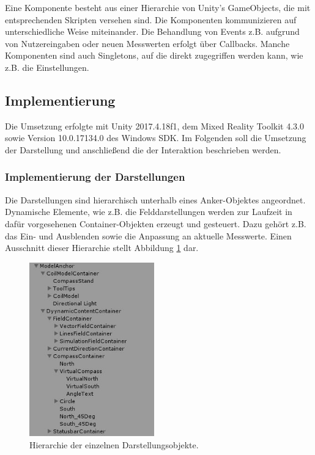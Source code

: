 Eine Komponente besteht aus einer Hierarchie von Unity's GameObjects, die mit entsprechenden Skripten versehen sind. Die Komponenten kommunizieren auf unterschiedliche Weise miteinander. Die Behandlung von Events z.B. aufgrund von Nutzereingaben oder neuen Messwerten erfolgt über Callbacks. Manche Komponenten sind auch Singletons, auf die direkt zugegriffen werden kann, wie z.B. die Einstellungen.

\subsection{Implementierung}
\label{sec-5-2}
Die Umsetzung erfolgte mit Unity 2017.4.18f1, dem Mixed Reality Toolkit 4.3.0 sowie Version 10.0.17134.0 des Windows SDK. Im Folgenden soll die Umsetzung der Darstellung und anschließend die der Interaktion beschrieben werden.

\subsubsection{Implementierung der Darstellungen}
\label{sec-5-2-2}
Die Darstellungen sind hierarchisch unterhalb eines Anker-Objektes angeordnet. Dynamische Elemente, wie z.B. die Felddarstellungen werden zur Laufzeit in dafür vorgesehenen Container-Objekten erzeugt und gesteuert. Dazu gehört z.B. das Ein- und Ausblenden sowie die Anpassung an aktuelle Messwerte. Einen Ausschnitt dieser Hierarchie stellt Abbildung \ref{img:hirarch} dar.\\

\begin{figure}
	\centering
	\includegraphics[width=0.48\textwidth]{images/unity/hirarchy.jpg}
	\caption{Hierarchie der einzelnen Darstellungsobjekte.}
	\label{img:hirarch}
\end{figure}


